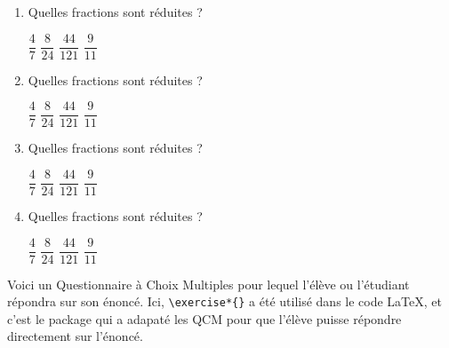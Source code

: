 \documentclass[a4,12pt]{article}
\begin{document}
\begin{enumerate}
	\item Quelles fractions sont réduites ?
	\begin{choices*}[4]
		\choice $\dfrac{4}{7}$
		\choice $\dfrac{8}{24}$
		\choice $\dfrac{44}{121}$
		\choice $\dfrac{9}{11}$
	\end{choices*}

	\item Quelles fractions sont réduites ?
	\begin{choices*}[2]
		\choice $\dfrac{4}{7}$
		\choice $\dfrac{8}{24}$
		\choice $\dfrac{44}{121}$
		\choice $\dfrac{9}{11}$
	\end{choices*}

	\item Quelles fractions sont réduites ?
	\begin{inlineChoices*}
		\choice $\dfrac{4}{7}$
		\choice $\dfrac{8}{24}$
		\choice $\dfrac{44}{121}$
		\choice $\dfrac{9}{11}$
	\end{inlineChoices*}

	\item Quelles fractions sont réduites ?

	\begin{inlineChoices*}
		\choice $\dfrac{4}{7}$
		\choice $\dfrac{8}{24}$
		\choice $\dfrac{44}{121}$
		\choice $\dfrac{9}{11}$
	\end{inlineChoices*}
\end{enumerate}


\newpage

\exercise*{}


Voici un Questionnaire à Choix Multiples pour lequel
l'élève ou l'étudiant répondra sur son énoncé.
Ici, \verb+\exercise*{}+ a été utilisé dans le code
\LaTeX{}, et c'est le package qui a adapaté les QCM
pour que l'élève puisse répondre directement sur
l'énoncé.
\end{document}
